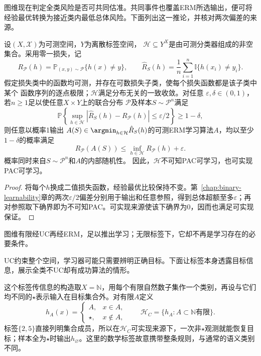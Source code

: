 图维现在判定全类风险是否可共同估准。共同事件也覆盖ERM所选输出，便可将经验最优转换为接近类内最低总体风险。下面列出这一推论，并核对两次偏差的来源。

\begin{theorem}[一致收敛推出可学习性]
\label{thm:multiclass-uniform-pac}
设$(X,\mathcal X)$为可测空间，$Y$为离散标签空间，
$\mathcal H\subseteq Y^X$是由可测分类器组成的非空集合。采用零一损失，记
\[
 R_{\mathcal P}(h)=\mathbb P_{(x,y)\sim\mathcal P}\{h(x)\neq y\},\qquad
 \hat R_S(h)=\frac1n\sum_{i=1}^n\mathbb I\{h(x_i)\neq y_i\}.
\]
假定损失类中的函数均可测，并存在可数损失子类，使每个损失函数都是该子类中某个
函数序列的逐点极限；$\mathcal H$满足分布无关的一致收敛。对任意
$\varepsilon,\delta\in(0,1)$，若$n\geq1$足以使任意$X\times Y$上的联合分布
$\mathcal P$及样本$S\sim\mathcal P^n$满足
\[
 \mathbb P\!\left\{
 \sup_{h\in\mathcal H}|\hat R_S(h)-R_{\mathcal P}(h)|\leq\varepsilon/2
 \right\}\geq1-\delta,
\]
则任意以概率1输出
$A(S)\in\argmin_{h\in\mathcal H}\hat R_S(h)$的可测ERM学习算法$A$，均以至少
$1-\delta$的概率满足
\[
 R_{\mathcal P}(A(S))\leq\inf_{h\in\mathcal H}R_{\mathcal P}(h)+\varepsilon.
\]
概率同时来自$S\sim\mathcal P^n$和$A$的内部随机性。
因此，$\mathcal H$不可知PAC可学习，也可实现PAC可学习。
\end{theorem}

\begin{proof}
将每个$h$换成二值损失函数，经验最优比较保持不变。第~\ref{chap:binary-learnability}章的两次$\varepsilon/2$偏差分别用于输出和任意参照，得到总体超额至多$\varepsilon$；再对参照取下确界即为不可知PAC。可实现来源使该下确界为0，因而也满足可实现保证。
\end{proof}

图维有限经UC再经ERM，足以推出学习；无限标签下，它却不再是学习存在的必要条件。

UC约束整个空间，学习器可能只需要辨明正确目标。下面让标签本身透露目标信息，展示全类不UC却有成功算法的情形。

这个标签传信息的构造取$X=\mathbb N$，用每个有限自然数子集作一个类别，再设与它们均不同的$\star$表示输入在目标集合外。对有限$A$定义
\begin{equation}
 h_A(x)=\begin{cases}A,&x\in A,\\\star,&x\notin A,\end{cases}
 \qquad\mathcal H_C=\{h_A:A\subset\mathbb N\text{有限}\}.
 \label{eq:cantor-class}
\end{equation}
标签$\{2,5\}$直接列明集合成员，所以在$\mathcal H_C$可实现来源下，一次非$\star$观测就能恢复目标；样本全为$\star$时输出$h_{\varnothing}$。这里的数学标签故意携带整条规则，与通常的语义类别不同。

